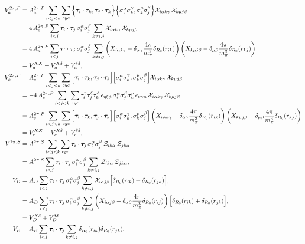 \documentclass[aps,prc,twocolumn,superscriptaddress,showpacs,floatfix,nofootinbib]{revtex4-1}
\begin{document}
\begin{widetext}
\begin{align}
V_a^{2\pi,P}&=A_a^{2\pi,P}\sum_{i<j<k}\sum_{cyc}\Big\{\bm{\tau}_i\cdot\bm{\tau}_k,\bm{\tau}_j\cdot\bm{\tau}_k\Big\}
\Big\{\sigma_i^\alpha\sigma_k^\gamma,\sigma_k^\mu\sigma_j^\beta\Big\}
{\cal X}_{i\alpha k\gamma}\,{\cal X}_{k\mu j\beta}
\nonumber \\
&=4\,A_a^{2\pi,P}\sum_{i<j}\bm{\tau}_i\cdot\bm{\tau}_j\,\sigma_i^\alpha\sigma_j^\beta
\sum_{k\neq i,j}{\cal X}_{i\alpha k\gamma}\,{\cal X}_{k\mu j\beta} 
\nonumber \\
&=4\,A_a^{2\pi,P}\sum_{i<j}\bm{\tau}_i\cdot\bm{\tau}_j\,\sigma_i^\alpha\sigma_j^\beta
\sum_{k\neq i,j}\left(X_{i\alpha k\gamma}-\delta_{\alpha\gamma}\frac{4\pi}{m_\pi^3}\delta_{R_0}(r_{ik})\right)
\left(X_{k\mu j\beta}-\delta_{\mu\beta}\frac{4\pi}{m_\pi^3}\delta_{R_0}(r_{kj})\right)
\nonumber \\
&=V_a^{XX}+V_a^{X\delta}+V_a^{\delta\delta} ,
\label{eq:anti}
\\
V_c^{2\pi,P}&=A_c^{2\pi,P}\sum_{i<j<k}\sum_{cyc}\Big[\bm{\tau}_i\cdot\bm{\tau}_k,\bm{\tau}_j\cdot\bm{\tau}_k\Big]
\Big[\sigma_i^\alpha\sigma_k^\gamma,\sigma_k^\mu\sigma_j^\beta\Big]
{\cal X}_{i\alpha k\gamma}\,{\cal X}_{k\mu j\beta}
\nonumber \\
&=-4\,A_c^{2\pi,P}\sum_{i<j<k}\sum_{cyc}\tau_i^\eta\tau_j^\xi\tau_k^\phi\,\epsilon_{\eta\xi\phi}\,
\sigma_i^\alpha\sigma_j^\beta\sigma_k^\nu\,\epsilon_{\nu\gamma\mu}\,{\cal X}_{i\alpha k\gamma}\,{\cal X}_{k\mu j\beta} 
\nonumber \\
&=A_c^{2\pi,P}\sum_{i<j<k}\sum_{cyc}\Big[\bm{\tau}_i\cdot\bm{\tau}_k,\bm{\tau}_j\cdot\bm{\tau}_k\Big]
\Big[\sigma_i^\alpha\sigma_k^\gamma,\sigma_k^\mu\sigma_j^\beta\Big]
\left(X_{i\alpha k\gamma}-\delta_{\alpha\gamma}\frac{4\pi}{m_\pi^3}\delta_{R_0}(r_{ik})\right)
\left(X_{k\mu j\beta}-\delta_{\mu\beta}\frac{4\pi}{m_\pi^3}\delta_{R_0}(r_{kj})\right) 
\nonumber \\
&=V_c^{XX}+V_c^{X\delta}+V_c^{\delta\delta} ,
\label{eq:comm}
\\
V^{2\pi,S}&=A^{2\pi,S}\sum_{i<j<k}\sum_{cyc}
\bm{\tau}_i\cdot\bm{\tau}_j\,\sigma_i^\alpha\sigma_j^\beta\,{\cal Z}_{ik\alpha}\,{\cal Z}_{jk\alpha}
\nonumber \\
&=A^{2\pi,S}\sum_{i<j}\bm{\tau}_i\cdot\bm{\tau}_j\,\sigma_i^\alpha\sigma_j^\beta
\sum_{k\neq i,j}{\cal Z}_{ik\alpha}\,{\cal Z}_{jk\alpha} ,
\label{eq:tm}
\\
V_D&=A_D\sum_{i<j}\bm{\tau}_i\cdot\bm{\tau}_j\,\sigma_i^\alpha\sigma_j^\beta
\sum_{k\neq i,j}{\cal X}_{i\alpha j\beta}\Big[\delta_{R_0}(r_{ik})+\delta_{R_0}(r_{jk})\Big] , 
\nonumber \\
&=A_D\sum_{i<j}\bm{\tau}_i\cdot\bm{\tau}_j\,\sigma_i^\alpha\sigma_j^\beta
\sum_{k\neq i,j}\left(X_{i\alpha j\beta}-\delta_{\alpha\beta}\frac{4\pi}{m_\pi^3}\delta_{R_0}(r_{ij})\right) \Big[\delta_{R_0}(r_{ik})+\delta_{R_0}(r_{jk})\Big] , 
\nonumber \\
&=V_D^{X\delta}+V_D^{\delta\delta}
\label{eq:vd}
\\
V_E&=A_E\sum_{i<j}\bm{\tau}_i\cdot\bm{\tau}_j\sum_{k\neq i,j}\delta_{R_0}(r_{ik})\delta_{R_0}(r_{jk}) ,
\label{eq:ve}
\end{align}
\end{widetext}
\end{document}
